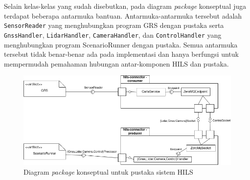 Selain kelas-kelas yang sudah disebutkan, pada diagram \textit{package}
konseptual juga terdapat beberapa antarmuka bantuan. Antarmuka-antarmuka
tersebut adalah \texttt{SensorReader} yang menghubungkan program GRS
dengan pustaka serta \texttt{Gnss\-Hand\-ler}, \texttt{LidarHandler},
\texttt{CameraHandler}, dan \texttt{ControlHandler} yang menghubungkan program
ScenarioRunner dengan pustaka. Semua antarmuka tersebut tidak benar-benar ada
pada implementasi dan hanya berfungsi untuk mempermudah pemahaman hubungan
antar-komponen HILS dan pustaka.
\begin{figure}[!htbp]
	\centering
	\includegraphics[width=1.0\textwidth]{resources/chapter-4/conceptual-package-diagram.png}
	\caption{Diagram \textit{package} konseptual untuk pustaka sistem HILS}
	\label{chapter-4-conseptual-package-diagram}
\end{figure}

